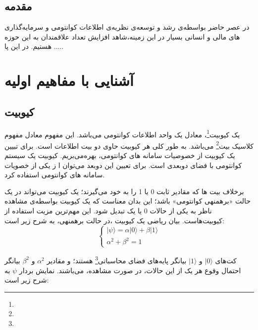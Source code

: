 \documentclass{book}
\begin{document}
\tableofcontents
\section{مقدمه}	
در عصر حاضر بواسطه‌ی رشد و توسعه‌ی نظریه‌ی اطلاعات کوانتومی و سرمایه‌گذاری های مالی و انسانی بسیار در این زمینه،‌شاهد افزایش تعداد علاقمندان به این حوزه هستیم. در این پا .....

\chapter{آشنایی با مفاهیم اولیه}
\section{کیوبیت}

یک کیوبیت\footnote{}، معادل یک واحد اطلاعات کوانتومی می‌باشد. این مفهوم معادل مفهوم کلاسیک بیت\footnote{} می‌باشد. به طور کلی هر کیوبیت حاوی دو بیت اطلاعات است. برای تبیین یک کیوبیت از خصوصیات سامانه های کوانتومی، بهره‌می‌بریم. کیوبیت یک سیستم کوانتومی با فضای دوبعدی است. برای تعیین این دوبعد می‌توان ا ز یکی از خصویات سامانه های کوانتومی استفاده کرد. 

برخلاف بیت ها که مقادیر ثابت 0 یا 1 را به خود می‌گیرند؛ یک کیوبیت می‌تواند در یک حالت «برهمنهی کوانتومی» باشد؛ این بدان معناست که یک کیوبیت بواسطه‌ی مشاهده ناظر به یکی از حالات 0 یا یک تبدیل شود. این مهم‌ترین مزیت استفاده از کیوبیت‌هاست. بیان ریاضی یک کیوبیت ،در حالت برهمنهی، به شرح زیر است:
\vspace{2cm}
$$
\left\{
\begin{array}{ll}
	  \vert \psi \rangle = \alpha\vert 0 \rangle + \beta\vert 1 \rangle \\
	  \alpha^2 + \beta^2 = 1
\end{array}
\right.
$$
\vspace{2cm}

\newpage
کت‌های $\vert 0 \rangle$ و $\vert 1 \rangle$ بیانگر پایه‌های فضای 
محاسباتی\footnote{} هستند؛ و مقادیر $\alpha^2$ و $\beta^2$ بیانگر احتمال وقوع هر یک از این حالات، در صورت مشاهده، می‌باشند. نمایش بردار $\psi$ به شرح زیر است:
\begin{center}
\end{center}
\end{document}

